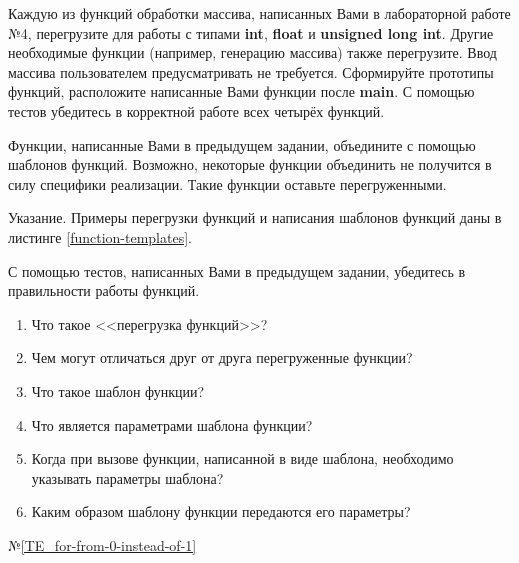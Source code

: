 
\labtask

Каждую из функций обработки массива, написанных Вами в лабораторной работе №4, перегрузите для работы с типами \textbf{int}, \textbf{float} и \textbf{unsigned long int}.
Другие необходимые функции (например, генерацию массива) также перегрузите.
Ввод массива пользователем предусматривать не требуется.
Сформируйте прототипы функций, расположите написанные Вами функции после \textbf{main}.
С помощью тестов убедитесь в корректной работе всех четырёх функций.


\labtask

Функции, написанные Вами в предыдущем задании, объедините с помощью шаблонов функций.
Возможно, некоторые функции объединить не получится в силу специфики реализации.
Такие функции оставьте перегруженными.

Указание. Примеры перегрузки функций и написания шаблонов функций даны в листинге \ref{function-templates}.

С помощью тестов, написанных Вами в предыдущем задании, убедитесь в правильности работы функций.


\labworkquestions
\begin{enumerate}
	\item
		Что такое <<перегрузка функций>>?
	\item
		Чем могут отличаться друг от друга перегруженные функции?
	\item
		Что такое шаблон функции?
	\item
		Что является параметрами шаблона функции?
	\item
		Когда при вызове функции, написанной в виде шаблона, необходимо указывать параметры шаблона?
	\item
		Каким образом шаблону функции передаются его параметры?
\end{enumerate}

\typerrors
№\ref{TE_for-from-0-instead-of-1}%
